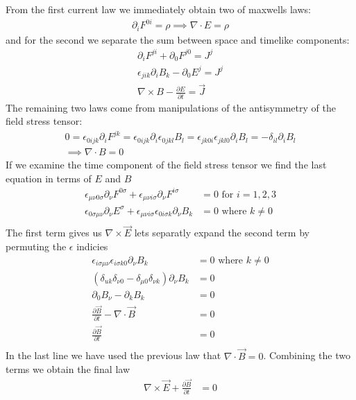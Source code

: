 From the first current law we immediately obtain two of maxwells laws:
\begin{align*}
\partial_i F^{0i} = \rho \implies \nabla \cdot E = \rho
\end{align*}
and for the second we separate the sum between space and timelike components:
\begin{align*}
\partial_i F^{ji} + \partial_0 F^{j0} = J^j\\
\epsilon_{jik} \partial_i B_k - \partial_0 E^j = J^j\\
\nabla \times B - \frac{\partial E}{\partial t} = \vec J
\end{align*}
The remaining two laws come from manipulations of the antisymmetry of the field stress tensor:
\begin{align*}
0 = \epsilon_{0ijk} \partial_i F^{jk} =
\epsilon_{0ijk} \partial_i \epsilon_{0jkl} B_l =
\epsilon_{jk0i}  \epsilon_{jkl0} \partial_i B_l  =
-\delta_{il} \partial_i B_l  \\
\implies \nabla \cdot B = 0
\end{align*}
If we examine the time component of the field stress tensor we find the last equation in terms of $E$ and $B$
\begin{align*}
\epsilon_{\mu\nu0\sigma} \partial_\nu F^{0\sigma} + \epsilon_{\mu\nu i\sigma} \partial_\nu F^{i\sigma}&= 0 \text { for } i=1,2,3\\
\epsilon_{0\sigma\mu\nu} \partial_\nu E^{\sigma} + \epsilon_{\mu\nu i\sigma}  \epsilon_{0i\sigma k} \partial_\nu B_k&= 0 \text{ where } k\neq 0\\
\end{align*}
The first term gives us $\nabla \times \vec E$ lets separatly expand the second term by permuting the $\epsilon$ indicies
\begin{align*}
\epsilon_{i\sigma \mu\nu}  \epsilon_{i\sigma k 0}  \partial_\nu B_k&= 0 \text{ where } k\neq 0\\
(\delta_{uk} \delta_{\nu 0} - \delta_{\mu 0} \delta_{\nu k} )  \partial_\nu B_k&= 0\\
 \partial_0 B_\nu - \partial_k B_k&= 0\\
\frac{\partial \vec B}{\partial t} - \nabla \cdot \vec B&= 0\\
\frac{\partial \vec B}{\partial t}&= 0\\
\end{align*}
In the last line we have used the previous law that $\nabla \cdot \vec B = 0$. Combining the two terms we obtain the 
final law
\begin{align*}
\nabla \times \vec E + \frac{\partial \vec B}{\partial t}&= 0\\
\end{align*}
